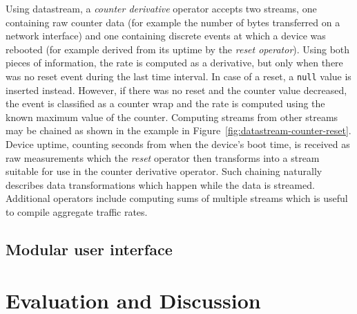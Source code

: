 \documentclass[5p,sort&compress]{elsarticle}
\begin{document}
Using datastream, a \textit{counter derivative} operator accepts two streams, one containing raw counter data (for example the number of bytes transferred on a network interface) and one containing discrete events at which a device was rebooted (for example derived from its uptime by the \textit{reset operator}).
Using both pieces of information, the rate is computed as a derivative, but only when there was no reset event during the last time interval.
In case of a reset, a \texttt{null} value is inserted instead.
However, if there was no reset and the counter value decreased, the event is classified as a counter wrap and the rate is computed using the known maximum value of the counter.
Computing streams from other streams may be chained as shown in the example in Figure~\ref{fig:datastream-counter-reset}.
Device uptime, counting seconds from when the device's boot time, is received as raw measurements which the \textit{reset} operator then transforms into a stream suitable for use in the counter derivative operator.
Such chaining naturally describes data transformations which happen while the data is streamed.
Additional operators include computing sums of multiple streams which is useful to compile aggregate traffic rates.

\subsection{Modular user interface}


\section{Evaluation and Discussion}
\label{sec:evaluation}
\end{document}

